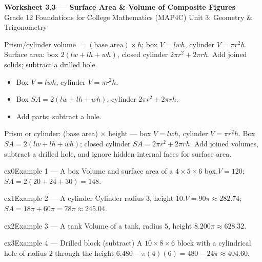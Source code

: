 \documentclass[11pt]{article}
\begin{document}
\begin{center}
{\LARGE\bfseries\color{titleblue}Worksheet 3.3 --- Surface Area \& Volume of Composite Figures}\\[2pt]
{\small Grade 12 Foundations for College Mathematics (MAP4C) \textperiodcentered{} Unit 3: Geometry \& Trigonometry}
\end{center}

\begin{ideabox}
Prism/cylinder volume $=(\text{base area})\times h$; box $V=lwh$, cylinder $V=\pi r^2h$. Surface area: box $2(lw+lh+wh)$, closed cylinder $2\pi r^2+2\pi rh$. Add joined solids; subtract a drilled hole.
\begin{itemize}[leftmargin=*,itemsep=2pt]
  \item Box $V=lwh$, cylinder $V=\pi r^2h$.
  \item Box $SA=2(lw+lh+wh)$; cylinder $2\pi r^2+2\pi rh$.
  \item Add parts; subtract a hole.
\end{itemize}
\end{ideabox}

\begin{learnbox}
Prism or cylinder: (base area) $\times$ height — box $V=lwh$, cylinder $V=\pi r^2h$.
Box $SA=2(lw+lh+wh)$; closed cylinder $SA=2\pi r^2+2\pi rh$.
Add joined volumes, subtract a drilled hole, and ignore hidden internal faces for surface area.
\end{learnbox}


\begin{example}{ex0}{Example 1 --- A box}
Volume and surface area of a $4\times5\times6$ box.\soln $V=120$; $SA=2(20+24+30)=148$.
\end{example}

\begin{example}{ex1}{Example 2 --- A cylinder}
Cylinder radius $3$, height $10$.\soln $V=90\pi\approx282.74$; $SA=18\pi+60\pi=78\pi\approx245.04$.
\end{example}

\begin{example}{ex2}{Example 3 --- A tank}
Volume of a tank, radius $5$, height $8$.\soln $200\pi\approx628.32$.
\end{example}

\begin{example}{ex3}{Example 4 --- Drilled block (subtract)}
A $10\times8\times6$ block with a cylindrical hole of radius $2$ through the height $6$.\soln $480-\pi(4)(6)=480-24\pi\approx404.60$.
\end{example}
\end{document}
